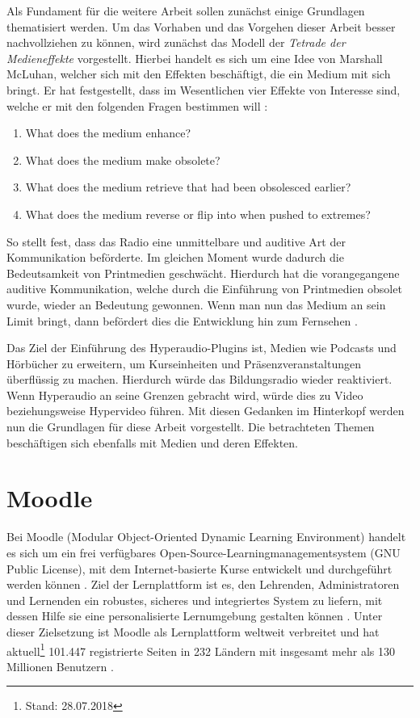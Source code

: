 \label{cha:grundlagen}
Als Fundament für die weitere Arbeit sollen zunächst einige Grundlagen thematisiert werden. Um das Vorhaben und das Vorgehen dieser Arbeit besser nachvollziehen zu können, wird zunächst das Modell der \textit{Tetrade der Medieneffekte} vorgestellt. Hierbei handelt es sich um eine Idee von Marshall McLuhan, welcher sich mit den Effekten beschäftigt, die ein Medium mit sich bringt. Er hat festgestellt, dass im Wesentlichen vier Effekte von Interesse sind, welche er mit den folgenden Fragen bestimmen will \citep{mcluhan1977laws}:

\begin{enumerate}
\item What does the medium enhance?
\item What does the medium make obsolete?
\item What does the medium retrieve that had been obsolesced earlier?
\item What does the medium reverse or flip into when pushed to extremes?
\end{enumerate}

So stellt \cite{mcluhan1977laws} fest, dass das Radio eine unmittelbare und auditive Art der Kommunikation beförderte. Im gleichen Moment wurde dadurch die Bedeutsamkeit von Printmedien geschwächt. Hierdurch hat die vorangegangene auditive Kommunikation, welche durch die Einführung von Printmedien obsolet wurde, wieder an Bedeutung gewonnen. Wenn man nun das Medium an sein Limit bringt, dann befördert dies die Entwicklung hin zum Fernsehen \citep{mcluhan1977laws}.

Das Ziel der Einführung des Hyperaudio-Plugins ist, Medien wie Podcasts und Hörbücher zu erweitern, um Kurseinheiten und Präsenzveranstaltungen überflüssig zu machen. Hierdurch würde das Bildungsradio wieder reaktiviert. Wenn Hyperaudio an seine Grenzen gebracht wird, würde dies zu Video beziehungsweise Hypervideo führen. Mit diesen Gedanken im Hinterkopf werden nun die Grundlagen für diese Arbeit vorgestellt. Die betrachteten Themen beschäftigen sich ebenfalls mit Medien und deren Effekten.

\section{Moodle}
\label{sec:moodle}
Bei Moodle (Modular Object-Oriented Dynamic Learning Environment) handelt es sich um ein frei verfügbares Open-Source-Learningmanagementsystem (GNU Public License), mit dem Internet-basierte Kurse entwickelt und durchgeführt werden können \citep{moodle2015was}. Ziel der Lernplattform ist es, den Lehrenden, Administratoren und Lernenden ein robustes, sicheres und integriertes System zu liefern, mit dessen Hilfe sie eine personalisierte Lernumgebung gestalten können \citep{moodle2018about}. Unter dieser Zielsetzung ist Moodle als Lernplattform weltweit verbreitet und hat aktuell\footnote{Stand: 28.07.2018} 101.447 registrierte Seiten in 232 Ländern mit insgesamt mehr als 130 Millionen Benutzern \citep{moodle2018stats}.

